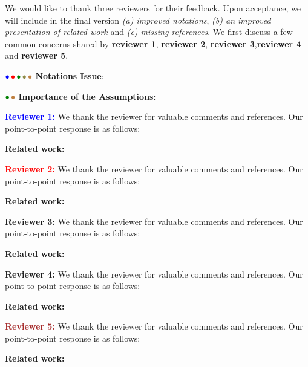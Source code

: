 \documentclass{article}
\begin{document}
We would like to thank three reviewers for their feedback. Upon acceptance, we will include in the final version \emph{{\sf (a)} improved notations}, \emph{{\sf (b)} an improved presentation of related work} and \emph{{\sf (c)} missing references}. 
We first discuss a few common concerns shared by \textbf{\color{blue}reviewer 1}, \textbf{\color{red} reviewer 2}, \textbf{\color{green!50!black}reviewer 3},\textbf{\color{yellow!50!black}reviewer 4} and \textbf{\color{brown}reviewer 5}.

${\color{blue}\bullet}\!~{\color{red}\bullet}\!~{\color{green!50!black}\bullet}\!~{\color{yellow!50!black}\bullet}\!~{\color{brown}\bullet}$ \textbf{Notations Issue}: 


${\color{green!50!black}\bullet}\!~{\color{brown}\bullet}$ \textbf{Importance of the Assumptions}: 



\textbf{\textcolor{blue}{Reviewer 1:}} We thank the reviewer for valuable comments and references. Our point-to-point response is as follows:

\textbf{Related work:}


\textbf{\textcolor{red}{Reviewer 2:}} We thank the reviewer for valuable comments and references. Our point-to-point response is as follows:

\textbf{Related work:}


\textbf{\textcolor{green!50!black}{Reviewer 3:}} We thank the reviewer for valuable comments and references. Our point-to-point response is as follows:

\textbf{Related work:}


\textbf{\textcolor{yellow!50!black}{Reviewer 4:}} We thank the reviewer for valuable comments and references. Our point-to-point response is as follows:

\textbf{Related work:}


\textbf{\textcolor{brown}{Reviewer 5:}} We thank the reviewer for valuable comments and references. Our point-to-point response is as follows:

\textbf{Related work:}
\end{document}
